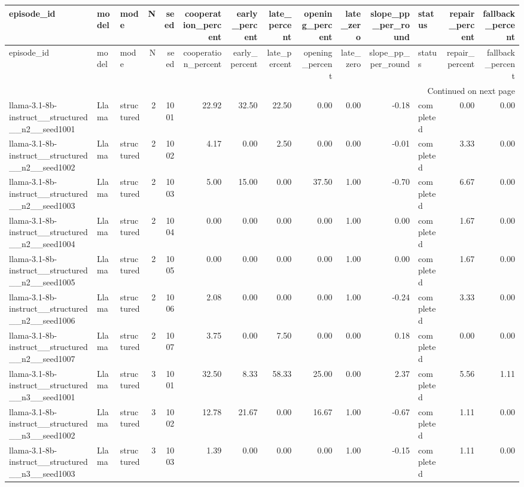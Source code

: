 \begin{longtable}{lllrrrrrrrrlrr}
\toprule
episode\_id & model & mode & N & seed & cooperation\_percent & early\_percent & late\_percent & opening\_percent & late\_zero & slope\_pp\_per\_round & status & repair\_percent & fallback\_percent \\
\midrule
\endfirsthead
\toprule
episode\_id & model & mode & N & seed & cooperation\_percent & early\_percent & late\_percent & opening\_percent & late\_zero & slope\_pp\_per\_round & status & repair\_percent & fallback\_percent \\
\midrule
\endhead
\midrule
\multicolumn{14}{r}{Continued on next page} \\
\midrule
\endfoot
\bottomrule
\endlastfoot
llama-3.1-8b-instruct\_\_structured\_\_n2\_\_seed1001 & Llama & structured & 2 & 1001 & 22.92 & 32.50 & 22.50 & 0.00 & 0.00 & -0.18 & completed & 0.00 & 0.00 \\
llama-3.1-8b-instruct\_\_structured\_\_n2\_\_seed1002 & Llama & structured & 2 & 1002 & 4.17 & 0.00 & 2.50 & 0.00 & 0.00 & -0.01 & completed & 3.33 & 0.00 \\
llama-3.1-8b-instruct\_\_structured\_\_n2\_\_seed1003 & Llama & structured & 2 & 1003 & 5.00 & 15.00 & 0.00 & 37.50 & 1.00 & -0.70 & completed & 6.67 & 0.00 \\
llama-3.1-8b-instruct\_\_structured\_\_n2\_\_seed1004 & Llama & structured & 2 & 1004 & 0.00 & 0.00 & 0.00 & 0.00 & 1.00 & 0.00 & completed & 1.67 & 0.00 \\
llama-3.1-8b-instruct\_\_structured\_\_n2\_\_seed1005 & Llama & structured & 2 & 1005 & 0.00 & 0.00 & 0.00 & 0.00 & 1.00 & 0.00 & completed & 1.67 & 0.00 \\
llama-3.1-8b-instruct\_\_structured\_\_n2\_\_seed1006 & Llama & structured & 2 & 1006 & 2.08 & 0.00 & 0.00 & 0.00 & 1.00 & -0.24 & completed & 3.33 & 0.00 \\
llama-3.1-8b-instruct\_\_structured\_\_n2\_\_seed1007 & Llama & structured & 2 & 1007 & 3.75 & 0.00 & 7.50 & 0.00 & 0.00 & 0.18 & completed & 0.00 & 0.00 \\
llama-3.1-8b-instruct\_\_structured\_\_n3\_\_seed1001 & Llama & structured & 3 & 1001 & 32.50 & 8.33 & 58.33 & 25.00 & 0.00 & 2.37 & completed & 5.56 & 1.11 \\
llama-3.1-8b-instruct\_\_structured\_\_n3\_\_seed1002 & Llama & structured & 3 & 1002 & 12.78 & 21.67 & 0.00 & 16.67 & 1.00 & -0.67 & completed & 1.11 & 0.00 \\
llama-3.1-8b-instruct\_\_structured\_\_n3\_\_seed1003 & Llama & structured & 3 & 1003 & 1.39 & 0.00 & 0.00 & 0.00 & 1.00 & -0.15 & completed & 1.11 & 0.00 \\

\end{longtable}
